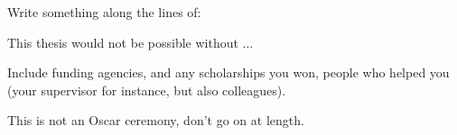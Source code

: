 \documentclass[../ThesisMain]{subfiles}
\begin{document}
\doublespacing%
\begin{acknowledgements}
Write something along the lines of:

This thesis would not be possible without $\ldots$

Include funding agencies, and any scholarships you won, people who helped you (your supervisor for instance, but also colleagues).

This is not an Oscar ceremony, don't go on at length.

\end{acknowledgements}
\newpage   
\end{document}
